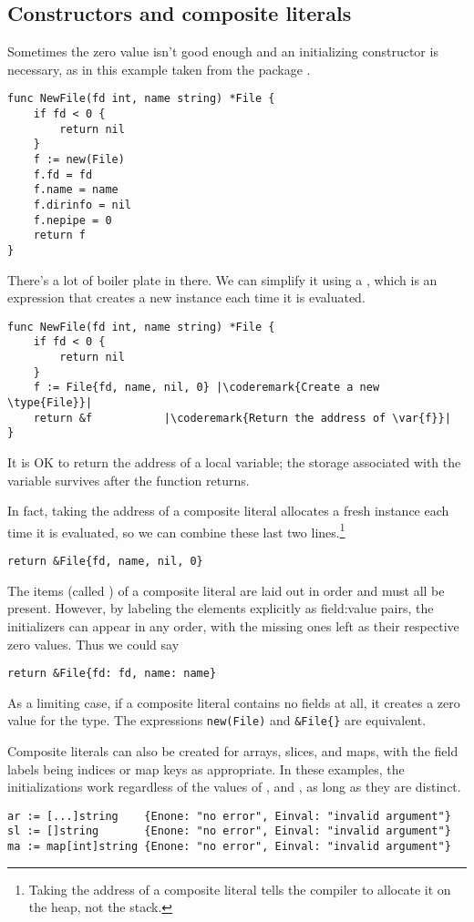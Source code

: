 \subsection{Constructors and composite literals}
\label{sec:constructors and composite literals}
Sometimes the zero value isn't good enough and an initializing
constructor is necessary, as in this example taken from the package
.
\begin{lstlisting}
func NewFile(fd int, name string) *File {
    if fd < 0 {
        return nil
    }
    f := new(File)
    f.fd = fd
    f.name = name
    f.dirinfo = nil
    f.nepipe = 0
    return f
}
\end{lstlisting}
There's a lot of boiler plate in there. We can simplify it using a
, which is an expression that 
creates a new instance each time it is evaluated.

\begin{lstlisting}
func NewFile(fd int, name string) *File {
    if fd < 0 {
        return nil
    }
    f := File{fd, name, nil, 0}	|\coderemark{Create a new \type{File}}|
    return &f			|\coderemark{Return the address of \var{f}}|
}
\end{lstlisting}
It is OK to return the address of a local variable;
the storage associated with the variable survives after the function
returns.

In fact, taking the address of a composite literal allocates a
fresh instance each time it is evaluated, so we can combine these last
two lines.\footnote{Taking the address of a composite literal tells the 
compiler to allocate it on the heap, not the stack.}
\begin{lstlisting}
return &File{fd, name, nil, 0}
\end{lstlisting}
The items (called ) of a composite 
literal are laid out in order and must all be
present. However, by labeling the elements explicitly as field:value
pairs, the initializers can appear in any order, with the missing ones
left as their respective zero values. Thus we could say

\begin{lstlisting}
return &File{fd: fd, name: name}
\end{lstlisting}
As a limiting case, if a composite literal contains no fields at all, it
creates a zero value for the type. The expressions
\lstinline{new(File)} and 
\lstinline|&File{}| are equivalent.

Composite literals can also be created for arrays, slices, and maps,
with the field labels being indices or map keys as appropriate. In these
examples, the initializations work regardless of the values of
, and , as long as they are distinct.
\begin{lstlisting}
ar := [...]string    {Enone: "no error", Einval: "invalid argument"}
sl := []string       {Enone: "no error", Einval: "invalid argument"}
ma := map[int]string {Enone: "no error", Einval: "invalid argument"}
\end{lstlisting}

